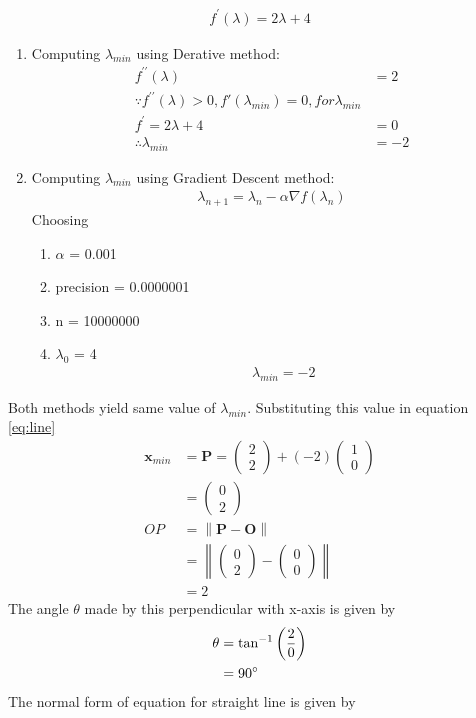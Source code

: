 \documentclass[12pt]{article}
\providecommand{\brak}[1]{\ensuremath{\left(#1\right)}}
\providecommand{\norm}[1]{\left\lVert#1\right\rVert}
\newcommand{\myvec}[1]{\ensuremath{\begin{pmatrix}#1\end{pmatrix}}}
\let\vec\mathbf
\begin{document}
\begin{align}
	\label{eq:eq4}
	f^\prime\brak{\lambda} = 2\lambda+4
\end{align}
\begin{enumerate}
\item Computing $\lambda_{min}$ using Derative method:
\begin{align}
	f^{\prime\prime}\brak{\lambda} &= 2\\
	\because f^{\prime\prime}\brak{\lambda}>0,f\prime\brak{\lambda_{min}}=0, for \lambda_{min}\\
	f^{\prime} = 2\lambda+4&=0\\
	\therefore \lambda_{min} &= -2
\end{align}
\item Computing $\lambda_{min}$ using Gradient Descent method:
\begin{align}
	\lambda_{n+1} = \lambda_n - \alpha\nabla f\brak{\lambda_n}
\end{align}
Choosing
\begin{enumerate}
\item $\alpha$ = 0.001
\item precision = 0.0000001
\item n = 10000000
\item $\lambda_0$ = 4
\begin{align}
	\lambda_{min} = -2
\end{align}
\end{enumerate}
\end{enumerate}
Both methods yield same value of $\lambda_{min}$. Substituting this value in equation \eqref{eq:line}
\begin{align}
	\vec{x}_{min} &= \vec{P} = \myvec{2\\2}+\brak{-2}\myvec{1\\0}\\
	&= \myvec{0\\2}\\
	OP &= \norm{\vec{P}-\vec{O}}\\
	&= \norm{\myvec{0\\2}-\myvec{0\\0}}\\
	&= 2
\end{align}
The angle $\theta$ made by this perpendicular with x-axis is given by
\begin{align}
	\theta &= \tan^{-1}{\brak{\frac{2}{0}}}\\
	&= 90\degree
\end{align}
The normal form of equation for straight line is given by 
\end{document}
